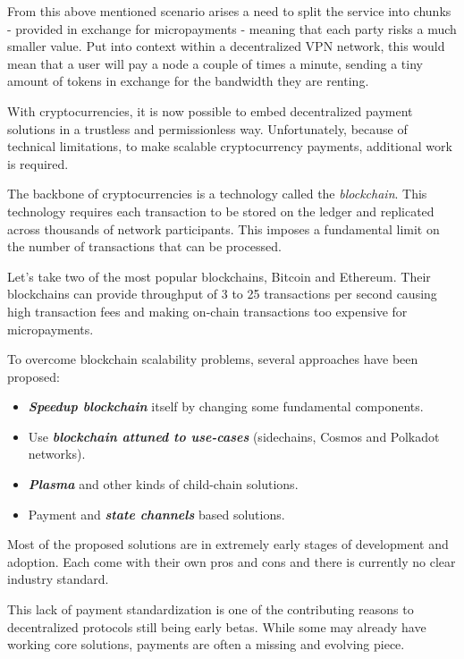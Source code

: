 \documentclass[a4paper,12pt]{article}
\begin{document}
From this above mentioned scenario arises a need to split the service into chunks
- provided in exchange for micropayments - meaning that each party risks a much 
smaller value. Put into context within a decentralized VPN network, this would 
mean that a user will pay a node a couple of times a minute, sending a tiny amount 
of tokens in exchange for the bandwidth they are renting. 

With cryptocurrencies, it is now possible to embed decentralized payment solutions 
in a trustless and permissionless way. Unfortunately, because of technical 
limitations, to make scalable cryptocurrency payments, additional work is required. 

The backbone of cryptocurrencies is a technology called the \textit{blockchain}. 
This technology requires each transaction to be stored on the ledger and replicated 
across thousands of network participants. This imposes a fundamental limit on the 
number of transactions that can be processed. 

Let’s take two of the most popular blockchains, Bitcoin and Ethereum. Their 
blockchains can provide throughput of 3 to 25 transactions per second causing high
transaction fees and making on-chain transactions too expensive for micropayments. 

To overcome blockchain scalability problems, several approaches have been 
proposed:

\begin{itemize}
    \item \textit{\textbf{Speedup blockchain}} itself by changing some 
    fundamental components.
    \item Use \textit{\textbf{blockchain attuned to use-cases}} (sidechains, 
    Cosmos and Polkadot networks). 
    \item \textit{\textbf{Plasma}} and other kinds of child-chain solutions.
    \item Payment and \textit{\textbf{state channels}} based solutions.
\end{itemize}

Most of the proposed solutions are in extremely early stages of development and 
adoption. Each come with their own pros and cons and there is currently no clear 
industry standard.

This lack of payment standardization is one of the contributing reasons to 
decentralized protocols still being early betas. While some may already have
working core solutions, payments are often a missing and evolving piece. \\
\end{document}
